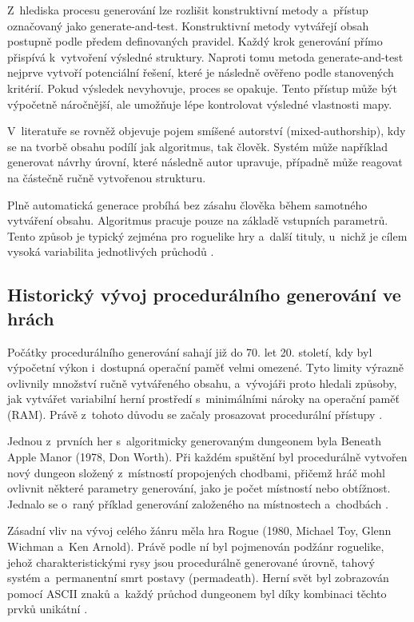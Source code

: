 \documentclass[
   program=itk,
   biblatex,
   figures=true,
   tables=true,
   glossaries,
   index
]{kidiplom}
\begin{document}
Z~hlediska procesu generování lze rozlišit konstruktivní metody a~přístup označovaný jako generate-and-test. Konstruktivní metody vytvářejí obsah postupně podle předem definovaných pravidel. Každý krok generování přímo přispívá k~vytvoření výsledné struktury. Naproti tomu metoda generate-and-test nejprve vytvoří potenciální řešení, které je následně ověřeno podle stanovených kritérií. Pokud výsledek nevyhovuje, proces se opakuje. Tento přístup může být výpočetně náročnější, ale umožňuje lépe kontrolovat výsledné vlastnosti mapy.

V~literatuře se rovněž objevuje pojem smíšené autorství (mixed-authorship), kdy se na tvorbě obsahu podílí jak algoritmus, tak člověk. Systém může například generovat návrhy úrovní, které následně autor upravuje, případně může reagovat na částečně ručně vytvořenou strukturu.

Plně automatická generace probíhá bez zásahu člověka během samotného vytváření obsahu. Algoritmus pracuje pouze na základě vstupních parametrů. Tento způsob je typický zejména pro roguelike hry a~další tituly, u~nichž je cílem vysoká variabilita jednotlivých průchodů \cite{Shaker2016}.

\subsection{Historický vývoj procedurálního generování ve hrách}
Počátky procedurálního generování sahají již do 70. let 20. století, kdy byl výpočetní výkon i~dostupná operační paměť velmi omezené. Tyto limity výrazně ovlivnily množství ručně vytvářeného obsahu, a~vývojáři proto hledali způsoby, jak vytvářet variabilní herní prostředí s~minimálními nároky na operační paměť (RAM). Právě z~tohoto důvodu se začaly prosazovat procedurální přístupy \cite{Shaker2016}.

Jednou z~prvních her s~algoritmicky generovaným dungeonem byla Beneath Apple Manor (1978, Don Worth). Při každém spuštění byl procedurálně vytvořen nový dungeon složený z~místností propojených chodbami, přičemž hráč mohl ovlivnit některé parametry generování, jako je počet místností nebo obtížnost. Jednalo se o~raný příklad generování založeného na místnostech a~chodbách \cite{Schuller_2021,enwiki:1260179812}.

Zásadní vliv na vývoj celého žánru měla hra Rogue (1980, Michael Toy, Glenn Wichman a~Ken Arnold). Právě podle ní byl pojmenován podžánr roguelike, jehož charakteristickými rysy jsou procedurálně generované úrovně, tahový systém a~permanentní smrt postavy (permadeath). Herní svět byl zobrazován pomocí ASCII znaků a~každý průchod dungeonem byl díky kombinaci těchto prvků unikátní \cite{PCGRogue,enwiki:1337873899,BerlinInterpretation2008}.
\end{document}
